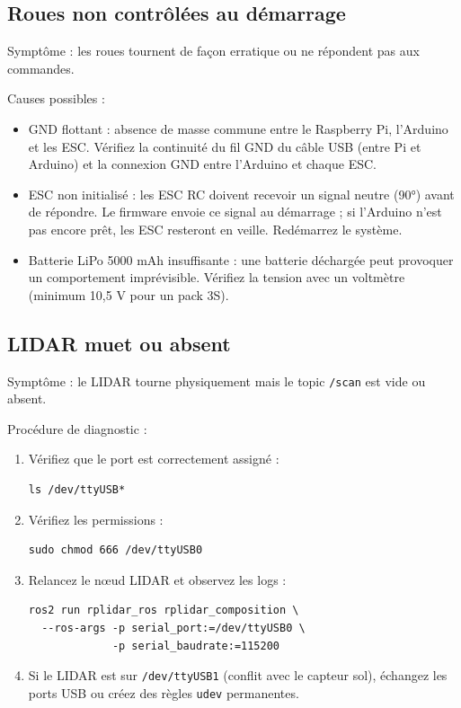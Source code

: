 \documentclass [12pt, a4paper]{article}
\begin{document}
\subsection{Roues non contrôlées au démarrage}
Symptôme : les roues tournent de façon erratique ou ne répondent pas aux commandes.

Causes possibles :
\begin{itemize}
    \item GND flottant : absence de masse commune entre le Raspberry Pi, l'Arduino et les ESC. Vérifiez la continuité du fil GND du câble USB (entre Pi et Arduino) et la connexion GND entre l'Arduino et chaque ESC.
    \item ESC non initialisé : les ESC RC doivent recevoir un signal neutre (90°) avant de répondre. Le firmware envoie ce signal au démarrage ; si l'Arduino n'est pas encore prêt, les ESC resteront en veille. Redémarrez le système.
    \item Batterie LiPo 5000 mAh insuffisante : une batterie déchargée peut provoquer un comportement imprévisible. Vérifiez la tension avec un voltmètre (minimum 10,5 V pour un pack 3S).
\end{itemize}

\subsection{LIDAR muet ou absent}
Symptôme : le LIDAR tourne physiquement mais le topic \texttt{/scan} est vide ou absent.

Procédure de diagnostic :
\begin{enumerate}
    \item Vérifiez que le port est correctement assigné :
\begin{verbatim}
ls /dev/ttyUSB*
\end{verbatim}
    \item Vérifiez les permissions :
\begin{verbatim}
sudo chmod 666 /dev/ttyUSB0
\end{verbatim}
    \item Relancez le nœud LIDAR et observez les logs :
\begin{verbatim}
ros2 run rplidar_ros rplidar_composition \
  --ros-args -p serial_port:=/dev/ttyUSB0 \
             -p serial_baudrate:=115200
\end{verbatim}
    \item Si le LIDAR est sur \texttt{/dev/ttyUSB1} (conflit avec le capteur sol), échangez les ports USB ou créez des règles \texttt{udev} permanentes.
\end{enumerate}
\end{document}
